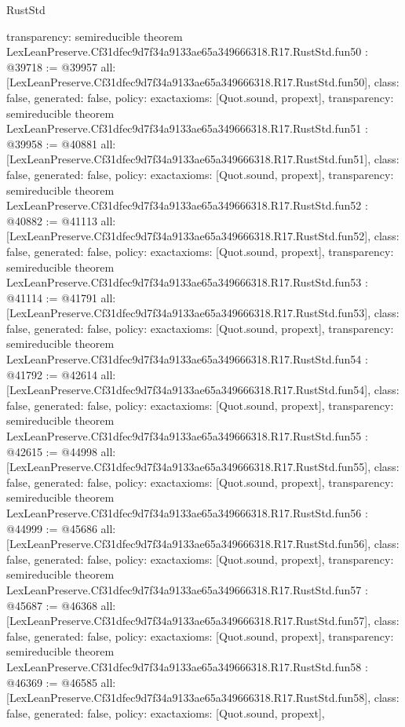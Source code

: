 \begin{lexlean}{RustStd}
\begin{coremodule}
{  transparency: semireducible
}
theorem LexLeanPreserve.Cf31dfec9d7f34a9133ae65a349666318.R17.RustStd.fun50 : @39718 := @39957 {
  all: [LexLeanPreserve.Cf31dfec9d7f34a9133ae65a349666318.R17.RustStd.fun50],
  class: false,
  generated: false,
  policy: exact{axioms: [Quot.sound, propext]},
  transparency: semireducible
}
theorem LexLeanPreserve.Cf31dfec9d7f34a9133ae65a349666318.R17.RustStd.fun51 : @39958 := @40881 {
  all: [LexLeanPreserve.Cf31dfec9d7f34a9133ae65a349666318.R17.RustStd.fun51],
  class: false,
  generated: false,
  policy: exact{axioms: [Quot.sound, propext]},
  transparency: semireducible
}
theorem LexLeanPreserve.Cf31dfec9d7f34a9133ae65a349666318.R17.RustStd.fun52 : @40882 := @41113 {
  all: [LexLeanPreserve.Cf31dfec9d7f34a9133ae65a349666318.R17.RustStd.fun52],
  class: false,
  generated: false,
  policy: exact{axioms: [Quot.sound, propext]},
  transparency: semireducible
}
theorem LexLeanPreserve.Cf31dfec9d7f34a9133ae65a349666318.R17.RustStd.fun53 : @41114 := @41791 {
  all: [LexLeanPreserve.Cf31dfec9d7f34a9133ae65a349666318.R17.RustStd.fun53],
  class: false,
  generated: false,
  policy: exact{axioms: [Quot.sound, propext]},
  transparency: semireducible
}
theorem LexLeanPreserve.Cf31dfec9d7f34a9133ae65a349666318.R17.RustStd.fun54 : @41792 := @42614 {
  all: [LexLeanPreserve.Cf31dfec9d7f34a9133ae65a349666318.R17.RustStd.fun54],
  class: false,
  generated: false,
  policy: exact{axioms: [Quot.sound, propext]},
  transparency: semireducible
}
theorem LexLeanPreserve.Cf31dfec9d7f34a9133ae65a349666318.R17.RustStd.fun55 : @42615 := @44998 {
  all: [LexLeanPreserve.Cf31dfec9d7f34a9133ae65a349666318.R17.RustStd.fun55],
  class: false,
  generated: false,
  policy: exact{axioms: [Quot.sound, propext]},
  transparency: semireducible
}
theorem LexLeanPreserve.Cf31dfec9d7f34a9133ae65a349666318.R17.RustStd.fun56 : @44999 := @45686 {
  all: [LexLeanPreserve.Cf31dfec9d7f34a9133ae65a349666318.R17.RustStd.fun56],
  class: false,
  generated: false,
  policy: exact{axioms: [Quot.sound, propext]},
  transparency: semireducible
}
theorem LexLeanPreserve.Cf31dfec9d7f34a9133ae65a349666318.R17.RustStd.fun57 : @45687 := @46368 {
  all: [LexLeanPreserve.Cf31dfec9d7f34a9133ae65a349666318.R17.RustStd.fun57],
  class: false,
  generated: false,
  policy: exact{axioms: [Quot.sound, propext]},
  transparency: semireducible
}
theorem LexLeanPreserve.Cf31dfec9d7f34a9133ae65a349666318.R17.RustStd.fun58 : @46369 := @46585 {
  all: [LexLeanPreserve.Cf31dfec9d7f34a9133ae65a349666318.R17.RustStd.fun58],
  class: false,
  generated: false,
  policy: exact{axioms: [Quot.sound, propext]},
}
\end{coremodule}
\end{lexlean}
